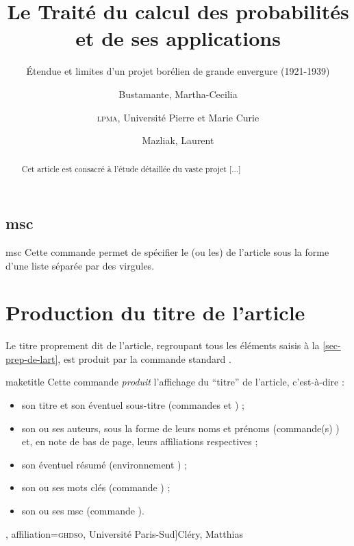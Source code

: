 \documentclass[french,nolocaltoc]{nwejmart}
\newtheorem[title=Fait,style=definition]{fact}
\begin{document}
\subsection{\texorpdfstring{\acrfull{msc}}{MSC}}

\begin{docCommand}[doc description=\mandatory]{msc}{}
  Cette commande permet de spécifier le (ou les)  de
  l'article sous la forme d'une liste séparée par des virgules.
\end{docCommand}

\section{Production du titre de l'article}
\label{sec-creation-du-titre}

Le titre proprement dit de l'article, regroupant tous les éléments saisis à la
\vref{sec-prep-de-lart}, est produit par la commande standard
.

\begin{docCommand}[doc description=\mandatory]{maketitle}{}
  Cette commande \emph{produit} l'affichage du \enquote{titre} de l'article,
  c'est-à-dire :
  \begin{itemize}
  \item son titre et son éventuel sous-titre (commandes  et
    ) ;
  \item son ou ses auteurs, sous la forme de leurs noms et prénoms (commande(s)
    ) et, en note de bas de page, leurs affiliations respectives ;
  \item son éventuel résumé (environnement ) ;
  \item son ou ses mots clés (commande ) ;
  \item son ou ses \acrshort{msc} (commande ).
  \end{itemize}
\end{docCommand}

\begin{bodycode}[listing options={deletekeywords={[5]keywords}}]
\title[Le Traité du calcul des probabilités]{Le Traité du calcul des
  probabilités et de ses applications}
\subtitle[Étendue et limites d'un projet borélien]{Étendue et limites
  d'un projet borélien de grande envergure (1921-1939)}
%
\author[
  affiliation={Laboratoire \textsc{sphere}, Université Paris Diderot}
  ]{Bustamante, Martha-Cecilia}
\author[
  affiliation=[aff2]{\textsc{lpma}, Université Pierre et Marie Curie},
  affiliation={\textsc{ghdso}, Université Paris-Sud}]{Cléry, Matthias}
\author[
  affiliationtagged={aff2}
]{Mazliak, Laurent}
%
\begin{abstract}
  Cet article est consacré à l'étude détaillée du vaste projet [...]
\end{abstract}
%
%
\maketitle
\end{bodycode}
\end{document}
